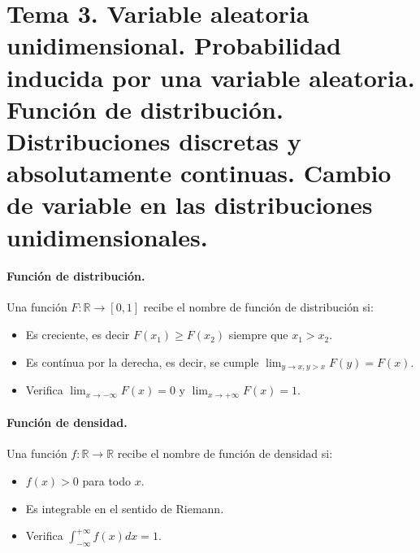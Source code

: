 \documentclass[oneside,spanish,a4paper]{article}
\newcommand{\sectioncol}[1]{\section{{\color{blue} #1}}}
\begin{document}
\sectioncol{Tema 3. Variable aleatoria unidimensional. Probabilidad inducida por una variable aleatoria. Funci\'on de distribuci\'on. Distribuciones discretas y absolutamente continuas. Cambio de variable en las distribuciones unidimensionales.}

\paragraph{Funci\'on de distribuci\'on.}

Una funci\'on $F:\mathbb{R}\to[0, 1]$ recibe el nombre de funci\'on de distribuci\'on
si:
\begin{itemize}
\item Es creciente, es decir $F(x_1)\geq F(x_2)$ siempre que $x_1>x_2$.
\item Es cont\'inua por la derecha, es decir, se cumple $\lim_{y\to x,y>x}{F(y)}=F(x)$.
\item Verifica $\lim_{x\to-\infty}{F(x)}=0$ y $\lim_{x\to+\infty}{F(x)}=1$.
\end{itemize}

\paragraph{Funci\'on de densidad.}

Una funci\'on $f:\mathbb{R}\to\mathbb{R}$ recibe el nombre de funci\'on de densidad
si:
\begin{itemize}
\item $f(x)>0$ para todo $x$.
\item Es integrable en el sentido de Riemann.
\item Verifica $\int_{-\infty}^{+\infty}f(x)dx=1$.
\end{itemize}
\end{document}
